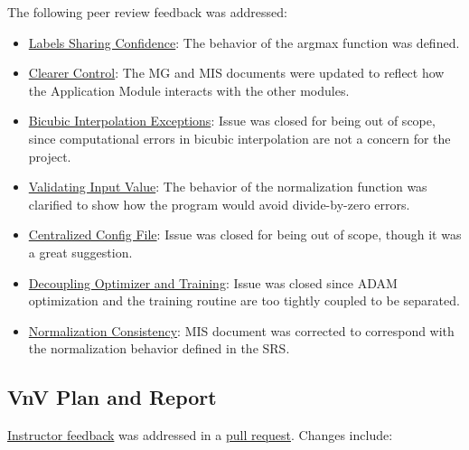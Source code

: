 \documentclass{article}
\begin{document}
\noindent The following peer review feedback was addressed:

\begin{itemize}
  \item \href{https://github.com/ptrandev/OCRacle/issues/27}{Labels Sharing Confidence}:
  The behavior of the argmax function was defined.
  \item \href{https://github.com/ptrandev/OCRacle/issues/26}{Clearer Control}:
  The MG and MIS documents were updated to reflect how the Application Module
  interacts with the other modules.
  \item \href{https://github.com/ptrandev/OCRacle/issues/25}{Bicubic Interpolation Exceptions}:
  Issue was closed for being out of scope, since computational errors in bicubic
  interpolation are not a concern for the project.
  \item \href{https://github.com/ptrandev/OCRacle/issues/24}{Validating Input Value}:
  The behavior of the normalization function was clarified to show how the program
  would avoid divide-by-zero errors.
  \item \href{https://github.com/ptrandev/OCRacle/issues/23}{Centralized Config File}:
  Issue was closed for being out of scope, though it was a great suggestion.
  \item \href{https://github.com/ptrandev/OCRacle/issues/22}{Decoupling Optimizer and Training}:
  Issue was closed since ADAM optimization and the training routine are too tightly
  coupled to be separated.
  \item \href{https://github.com/ptrandev/OCRacle/issues/21}{Normalization Consistency}:
  MIS document was corrected to correspond with the normalization behavior defined in the SRS.
\end{itemize}

\subsection{VnV Plan and Report}

\href{https://github.com/ptrandev/OCRacle/issues/10}{Instructor feedback} was addressed in
a \href{https://github.com/ptrandev/OCRacle/pull/29}{pull request}. Changes include:
\end{document}
